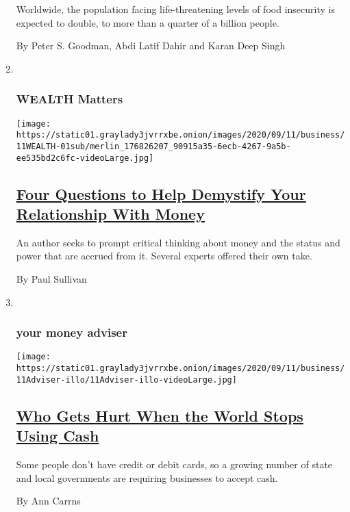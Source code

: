 \begin{enumerate}
  Worldwide, the population facing life-threatening levels of food
  insecurity is expected to double, to more than a quarter of a billion
  people.

  By Peter S. Goodman, Abdi Latif Dahir and Karan Deep Singh
\item ~
  \hypertarget{wealth-matters}{%
  \subsubsection{WEALTH Matters}\label{wealth-matters}}

  \texttt{[image: https://static01.graylady3jvrrxbe.onion/images/2020/09/11/business/11WEALTH-01sub/merlin\_176826207\_90915a35-6ecb-4267-9a5b-ee535bd2c6fc-videoLarge.jpg]}

  \hypertarget{four-questions-to-help-demystify-your-relationship-with-money}{%
  \subsection{\texorpdfstring{\href{/2020/09/11/your-money/four-questions-money.html}{Four
  Questions to Help Demystify Your Relationship With
  Money}}{Four Questions to Help Demystify Your Relationship With Money}}\label{four-questions-to-help-demystify-your-relationship-with-money}}

  An author seeks to prompt critical thinking about money and the status
  and power that are accrued from it. Several experts offered their own
  take.

  By Paul Sullivan
\item ~
  \hypertarget{your-money-adviser}{%
  \subsubsection{your money adviser}\label{your-money-adviser}}

  \texttt{[image: https://static01.graylady3jvrrxbe.onion/images/2020/09/11/business/11Adviser-illo/11Adviser-illo-videoLarge.jpg]}

  \hypertarget{who-gets-hurt-when-the-world-stops-using-cash}{%
  \subsection{\texorpdfstring{\href{/2020/09/11/your-money/cash-credit-cards-coronavirus.html}{Who
  Gets Hurt When the World Stops Using
  Cash}}{Who Gets Hurt When the World Stops Using Cash}}\label{who-gets-hurt-when-the-world-stops-using-cash}}

  Some people don't have credit or debit cards, so a growing number of
  state and local governments are requiring businesses to accept cash.

  By Ann Carrns
\end{enumerate}

